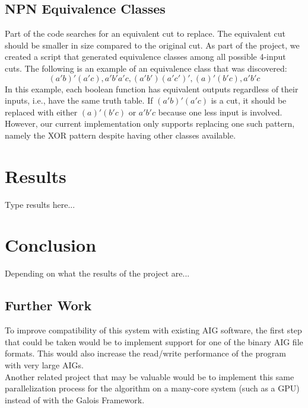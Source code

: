 \documentclass[twocolumn]{article}
\begin{document}
\subsection{NPN Equivalence Classes}
Part of the code searches for an equivalent cut to replace.  The equivalent cut should be smaller in size compared to the original cut.  As part of the project, we created a script that generated equivalence classes among all possible 4-input cuts.  The following is an example of an equivalence class that was discovered:\\
\begin{equation}
(a'b)'(a'c), a'b'a'c, (a'b')(a'c')', (a)'(b'c), a'b'c
\end{equation}
In this example, each boolean function has equivalent outputs regardless of their inputs, i.e., have the same truth table.  If $(a'b)'(a'c)$ is a cut, it should be replaced with either $(a)'(b'c)$ or $a'b'c$ because one less input is involved.  However, our current implementation only supports replacing one such pattern, namely the XOR pattern despite having other classes available.
\section{Results}
Type results here...
\section{Conclusion}
Depending on what the results of the project are...
\subsection{Further Work}
To improve compatibility of this system with existing AIG software, the first step that could be taken would be to implement support for one of the binary AIG file formats. This would also increase the read/write performance of the program with very large AIGs.\\\indent
Another related project that may be valuable would be to implement this same parallelization process for the algorithm on a many-core system (such as a GPU) instead of with the Galois Framework.


\end{document}
